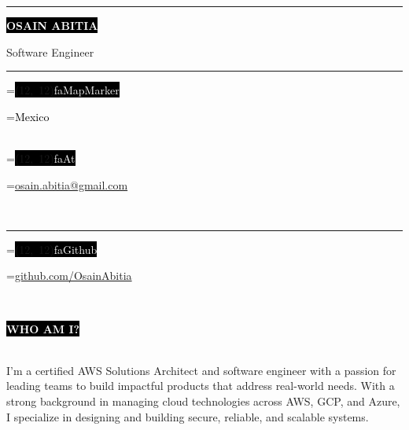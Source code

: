 \documentclass[10pt,A4]{article}
\newcommand*{\vcenteredhbox}[1]{\begingroup
	\setbox0=\hbox{#1}\parbox{\wd0}{\box0}\endgroup}
\newcommand{\icon}[2]{\colorbox{black}{\makebox(#2, #2){\textcolor{white}{\large\csname fa#1\endcsname}}}}	%
\newcommand{\icontext}[3]{ 						%
	\vcenteredhbox{\icon{#1}{#2}}\hspace{0.2cm}\vcenteredhbox{\textcolor{black}{#3}}
}
\newcounter{a}
\newcounter{b}
\newcounter{c}
\newcommand{\cvsection}[1] {
	\textcolor{white}{\MakeUppercase{\textbf{#1}}}
}
\newcommand{\cvsect}[1]{
	\colorbox{black}{{\cvsection{#1}}}\\\\%
}
\begin{document}
	
	\begin{minipage}[t]{0.45\textwidth}\hrule height 0pt width 0pt%
		\colorbox{black}{{\HUGE\textcolor{white}{\textbf{\MakeUppercase{Osain Abitia}}}}}%
		
		\vspace{1mm}\LARGE{Software Engineer}
	\end{minipage}%
	\begin{minipage}[t]{0.3\textwidth}\hrule height 0pt width 0pt%
		\small%
		\icontext{MapMarker}{12}{Mexico}\\
		\icontext{At}{12}{\href{mailto:osain.abitia@gmail.com}{osain.abitia@gmail.com}}\\	
	\end{minipage}%
	\begin{minipage}[t]{0.3\textwidth}\hrule height 0pt width 0pt%
		\small%
		\icontext{Github}{12}{\href{https://github.com/OsainAbitia}{github.com/OsainAbitia}}\\
	\end{minipage}%
	
	\small%
	\vspace{1cm}
	
	
	\cvsect{Who Am I?}%
	\begin{minipage}[t]{1\textwidth}%
		I'm a certified AWS Solutions Architect and software engineer with a passion for 
		leading teams to build impactful products that address real-world needs. With a
		strong background in managing cloud technologies across AWS, GCP, and Azure, I
		specialize in designing and building secure, reliable, and scalable systems.
	\end{minipage}%
	\hfill
	\vspace{1cm}
	
	
\end{document}
